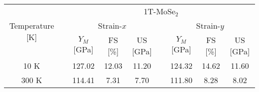 \documentclass[a4paper,fleqn]{cas-sc}
\begin{document}
\begin{table*}[]
		
		\begin{tabular}{clccclccc}
			\hline
			\multicolumn{1}{c}{\multirow{3}{*}{Temperature [K]}} & \multicolumn{1}{l}{} &                                                                                                      \multicolumn{7}{c}{1T-MoSe$_2$}                                                                                                      \\ \cline{3-9}
			                  \multicolumn{1}{c}{}                   & \multicolumn{1}{l}{} &                                     \multicolumn{3}{c}{ Strain-$x$}                                      & \multicolumn{1}{l}{} &                                      \multicolumn{3}{c}{Strain-$y$}                                      \\ \cline{3-5}\cline{7-9}
			                  \multicolumn{1}{c}{}                   & \multicolumn{1}{l}{} & \multicolumn{1}{c}{$Y_M$ {[}GPa{]}} & \multicolumn{1}{c}{FS {[}\%{]}} & \multicolumn{1}{c}{US {[}GPa{]}} & \multicolumn{1}{l}{} & \multicolumn{1}{c}{$Y_M$ {[}GPa{]}} & \multicolumn{1}{c}{FS {[}\%{]}} & \multicolumn{1}{c}{US {[}GPa{]}} \\ \cline{1-1}\cline{3-5}\cline{7-9}
			                          10 K                            &                      &               127.02                &              12.03              &              11.20               &                      &               124.32                &              14.62              &              11.60               \\
			                \multicolumn{1}{c}{300 K}                 & \multicolumn{1}{l}{} &     \multicolumn{1}{c}{114.41}      &    \multicolumn{1}{c}{7.31}     &     \multicolumn{1}{c}{7.70}     & \multicolumn{1}{l}{} &     \multicolumn{1}{c}{111.80}      &    \multicolumn{1}{c}{8.28}     &     \multicolumn{1}{c}{8.02}
		\end{tabular}
		

\end{table*}
\end{document}
